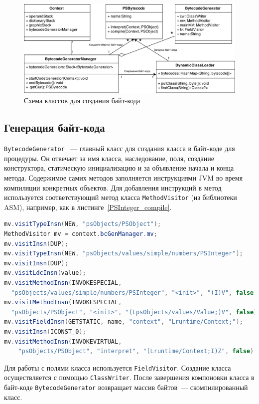 	\begin{figure} [h]
		\includegraphics[width=\linewidth]{Pozdin/bytecode_generation.png}
		\caption{Схема классов для создания байт-кода}\label{scheme}
	\end{figure}
	\subsection{Генерация байт-кода}
	\texttt{BytecodeGenerator} ~--- главный класс для создания класса в байт-коде для процедуры. Он отвечает за имя класса, наследование, поля, создание конструктора, статическую инициализацию и за объявление начала и конца метода. Содержимое самих методов заполняется инструкциями JVM во время компиляции конкретных объектов. Для добавления инструкций в метод используется соответствующий метод класса \texttt{MethodVisitor} (из библиотеки ASM), например, как в листинге~\ref{PSInteger_compile}. 

\begin{lstlisting}[label=PSInteger_compile,caption=Компиляция объектов \texttt{Integer},captionpos=b,language=Java,basicstyle=\scriptsize]
mv.visitTypeInsn(NEW, "psObjects/PSObject");
MethodVisitor mv = context.bcGenManager.mv;
mv.visitInsn(DUP);
mv.visitTypeInsn(NEW, "psObjects/values/simple/numbers/PSInteger");
mv.visitInsn(DUP);
mv.visitLdcInsn(value);
mv.visitMethodInsn(INVOKESPECIAL, 
  "psObjects/values/simple/numbers/PSInteger", "<init>", "(I)V", false);
mv.visitMethodInsn(INVOKESPECIAL,
  "psObjects/PSObject", "<init>", "(LpsObjects/values/Value;)V", false);		
mv.visitFieldInsn(GETSTATIC, name, "context", "Lruntime/Context;");
mv.visitInsn(ICONST_0);
mv.visitMethodInsn(INVOKEVIRTUAL,
	"psObjects/PSObject", "interpret", "(Lruntime/Context;I)Z", false);
\end{lstlisting}
	Для работы с полями класса используется \texttt{FieldVisitor}. Создание класса осуществляется с помощью \texttt{ClassWriter}. После завершения компоновки класса в байт-коде \texttt{BytecodeGenerator}	возвращает массив байтов~--- скомпилированный класс.
	
